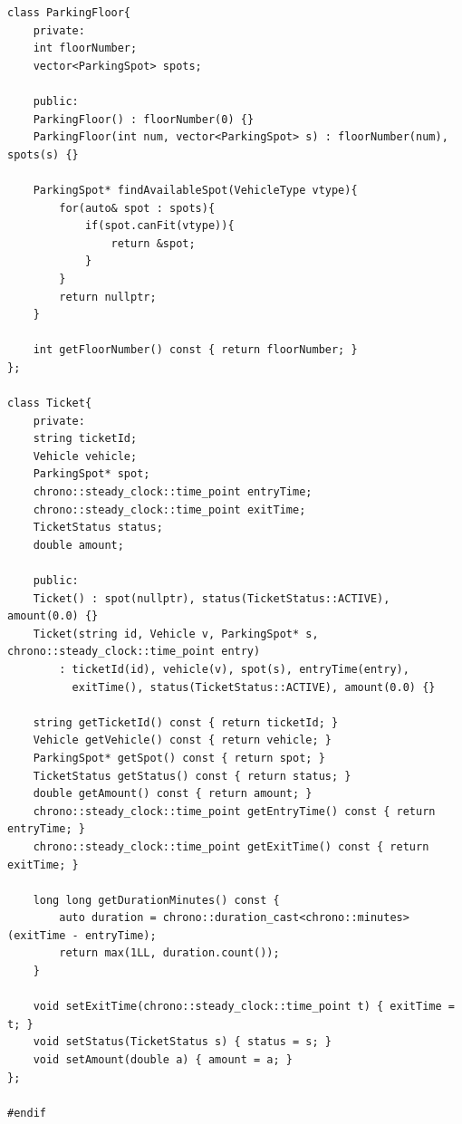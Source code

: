 \documentclass[11pt,a4paper]{article}
\begin{document}
\begin{lstlisting}[title={\texttt{models.hpp}}]
class ParkingFloor{
    private:
    int floorNumber;
    vector<ParkingSpot> spots;

    public:
    ParkingFloor() : floorNumber(0) {}
    ParkingFloor(int num, vector<ParkingSpot> s) : floorNumber(num), spots(s) {}

    ParkingSpot* findAvailableSpot(VehicleType vtype){
        for(auto& spot : spots){
            if(spot.canFit(vtype)){
                return &spot;
            }
        }
        return nullptr;
    }

    int getFloorNumber() const { return floorNumber; }
};

class Ticket{
    private:
    string ticketId;
    Vehicle vehicle;
    ParkingSpot* spot;
    chrono::steady_clock::time_point entryTime;
    chrono::steady_clock::time_point exitTime;
    TicketStatus status;
    double amount;

    public:
    Ticket() : spot(nullptr), status(TicketStatus::ACTIVE), amount(0.0) {}
    Ticket(string id, Vehicle v, ParkingSpot* s, chrono::steady_clock::time_point entry)
        : ticketId(id), vehicle(v), spot(s), entryTime(entry),
          exitTime(), status(TicketStatus::ACTIVE), amount(0.0) {}

    string getTicketId() const { return ticketId; }
    Vehicle getVehicle() const { return vehicle; }
    ParkingSpot* getSpot() const { return spot; }
    TicketStatus getStatus() const { return status; }
    double getAmount() const { return amount; }
    chrono::steady_clock::time_point getEntryTime() const { return entryTime; }
    chrono::steady_clock::time_point getExitTime() const { return exitTime; }

    long long getDurationMinutes() const {
        auto duration = chrono::duration_cast<chrono::minutes>(exitTime - entryTime);
        return max(1LL, duration.count());
    }

    void setExitTime(chrono::steady_clock::time_point t) { exitTime = t; }
    void setStatus(TicketStatus s) { status = s; }
    void setAmount(double a) { amount = a; }
};

#endif
\end{lstlisting}

\newpage
\end{document}
